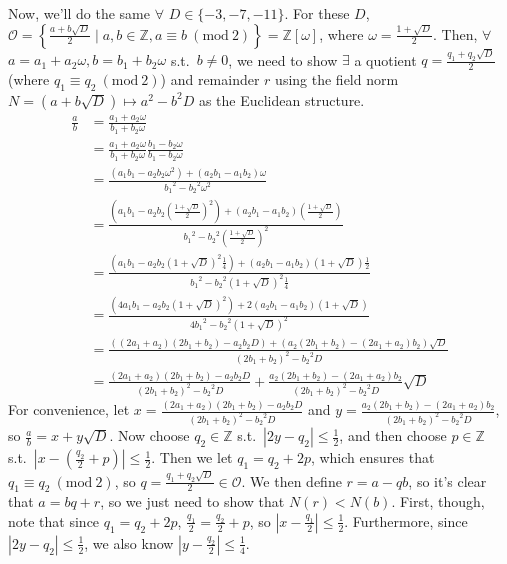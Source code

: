 \documentclass[fleqn]{article}
\newcommand{\Mod}[1]{\ (\mathrm{mod}\ #1)}
\begin{document}
        Now, we'll do the same $\forall$ $D \in \{-3, -7, -11\}$.  For these $D$, $\mathcal{O} = \left\{\frac{a + b\sqrt{D}}{2} \mid a, b \in \mathbb{Z}, a \equiv b \Mod{2}\right\} = \mathbb{Z}[\omega]$, where $\omega = \frac{1 + \sqrt{D}}{2}$.  Then, $\forall$ $a = a_1 + a_2 \omega, b = b_1 + b_2 \omega$ s.t.\ $b \neq 0$, we need to show $\exists$ a quotient $q = \frac{q_1 + q_2 \sqrt{D}}{2}$ (where $q_1 \equiv q_2 \Mod{2}$) and remainder $r$ using the field norm $N = \left(a + b\sqrt{D}\right) \mapsto a^2 - b^2 D$ as the Euclidean structure.
        \begin{align}
            \frac{a}{b} &= \frac{a_1 + a_2 \omega}{b_1 + b_2 \omega} \\
                &= \frac{a_1 + a_2 \omega}{b_1 + b_2 \omega} \frac{b_1 - b_2 \omega}{b_1 - b_2 \omega} \\
                &= \frac{(a_1 b_1 - a_2 b_2 \omega^2) + (a_2 b_1 - a_1 b_2) \omega}{{b_1}^2 - {b_2}^2 \omega^2} \\
                &= \frac{\left(a_1 b_1 - a_2 b_2 \left(\frac{1 + \sqrt{D}}{2}\right)^2\right) + (a_2 b_1 - a_1 b_2) \left(\frac{1 + \sqrt{D}}{2}\right)}{{b_1}^2 - {b_2}^2 \left(\frac{1 + \sqrt{D}}{2}\right)^2} \\
                &= \frac{\left(a_1 b_1 - a_2 b_2 \left(1 + \sqrt{D}\right)^2 \frac{1}{4}\right) + (a_2 b_1 - a_1 b_2) \left(1 + \sqrt{D}\right) \frac{1}{2}}{{b_1}^2 - {b_2}^2 \left(1 + \sqrt{D}\right)^2 \frac{1}{4}} \\
                &= \frac{\left(4a_1 b_1 - a_2 b_2 \left(1 + \sqrt{D}\right)^2\right) + 2(a_2 b_1 - a_1 b_2) \left(1 + \sqrt{D}\right)}{4{b_1}^2 - {b_2}^2 \left(1 + \sqrt{D}\right)^2} \\
                &= \frac{((2a_1 + a_2)(2b_1 + b_2) - a_2 b_2 D) + (a_2(2b_1 + b_2) - (2a_1 + a_2) b_2)\sqrt{D}}{(2b_1 + b_2)^2 - {b_2}^2 D} \\
                &= \frac{(2a_1 + a_2)(2b_1 + b_2) - a_2 b_2 D}{(2b_1 + b_2)^2 - {b_2}^2 D} + \frac{a_2(2b_1 + b_2) - (2a_1 + a_2) b_2}{(2b_1 + b_2)^2 - {b_2}^2 D} \sqrt{D}
        \end{align}
        For convenience, let $x = \frac{(2a_1 + a_2)(2b_1 + b_2) - a_2 b_2 D}{(2b_1 + b_2)^2 - {b_2}^2 D}$ and $y = \frac{a_2(2b_1 + b_2) - (2a_1 + a_2) b_2}{(2b_1 + b_2)^2 - {b_2}^2 D}$, so $\frac{a}{b} = x + y\sqrt{D}$.  Now choose $q_2 \in \mathbb{Z}$ s.t.\ $|2y - q_2| \leq \frac{1}{2}$, and then choose $p \in \mathbb{Z}$ s.t.\ $\left|x - \left(\frac{q_2}{2} + p\right)\right| \leq \frac{1}{2}$.  Then we let $q_1 = q_2 + 2p$, which ensures that $q_1 \equiv q_2 \Mod{2}$, so $q = \frac{q_1 + q_2 \sqrt{D}}{2} \in \mathcal{O}$.  We then define $r = a - qb$, so it's clear that $a = bq + r$, so we just need to show that $N(r) < N(b)$.  First, though, note that since $q_1 = q_2 + 2p$, $\frac{q_1}{2} = \frac{q_2}{2} + p$, so $\left|x - \frac{q_1}{2}\right| \leq \frac{1}{2}$.  Furthermore, since $|2y - q_2| \leq \frac{1}{2}$, we also know $\left|y - \frac{q_2}{2}\right| \leq \frac{1}{4}$.
\end{document}
